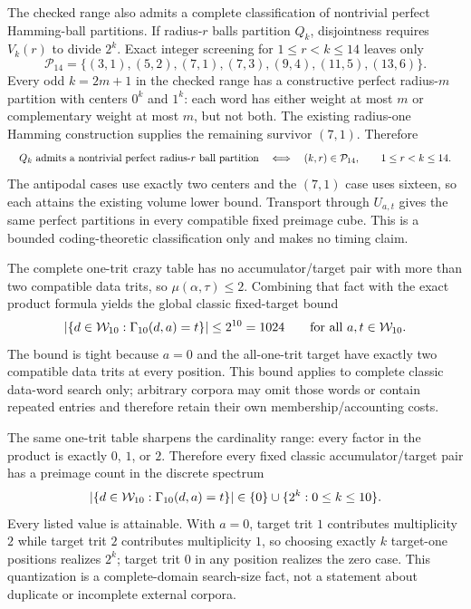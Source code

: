 \documentclass{article}
\newcommand{\fitmath}[1]{\resizebox{0.99\linewidth}{!}{$\displaystyle #1$}}
\begin{document}
The checked range also admits a complete classification of nontrivial perfect
Hamming-ball partitions. If radius-$r$ balls partition $Q_k$, disjointness
requires $V_k(r)$ to divide $2^k$. Exact integer screening for
$1\leq r<k\leq14$ leaves only
\[
  \mathcal{P}_{14}=\{(3,1),(5,2),(7,1),(7,3),(9,4),(11,5),(13,6)\}.
\]
Every odd $k=2m+1$ in the checked range has a constructive perfect radius-$m$
partition with centers $0^k$ and $1^k$: each word has either weight at most $m$
or complementary weight at most $m$, but not both. The existing radius-one
Hamming construction supplies the remaining survivor $(7,1)$. Therefore
\begin{equation}
  \fitmath{%
    Q_k\text{ admits a nontrivial perfect radius-$r$ ball partition}
      \quad\Longleftrightarrow\quad (k,r)\in\mathcal{P}_{14},
    \qquad 1\leq r<k\leq14.
  }
  \label{eq:optimization-crazy-preimage-cube-perfect-radius-classification}
\end{equation}
The antipodal cases use exactly two centers and the $(7,1)$ case uses sixteen,
so each attains the existing volume lower bound. Transport through $U_{a,t}$
gives the same perfect partitions in every compatible fixed preimage cube. This
is a bounded coding-theoretic classification only and makes no timing claim.

The complete one-trit crazy table has no accumulator/target pair with more than
two compatible data trits, so $\mu(\alpha,\tau)\leq2$. Combining that fact with
the exact product formula yields the global classic fixed-target bound
\begin{equation}
  \left|\{d\in\mathcal{W}_{10}:\Gamma_{10}\!\left(d,a\right)=t\}\right|
    \leq 2^{10}=1024
  \qquad\text{for all }a,t\in\mathcal{W}_{10}.
  \label{eq:optimization-crazy-preimage-bound}
\end{equation}
The bound is tight because $a=0$ and the all-one-trit target have exactly two
compatible data trits at every position. This bound applies to complete
classic data-word search only; arbitrary corpora may omit those words or contain
repeated entries and therefore retain their own membership/accounting costs.

The same one-trit table sharpens the cardinality range: every factor in the
product is exactly $0$, $1$, or $2$. Therefore every fixed classic
accumulator/target pair has a preimage count in the discrete spectrum
\begin{equation}
  \left|\{d\in\mathcal{W}_{10}:\Gamma_{10}\!\left(d,a\right)=t\}\right|
    \in \{0\}\cup\{2^k:0\leq k\leq10\}.
  \label{eq:optimization-crazy-preimage-spectrum}
\end{equation}
Every listed value is attainable. With $a=0$, target trit $1$ contributes
multiplicity $2$ while target trit $2$ contributes multiplicity $1$, so choosing
exactly $k$ target-one positions realizes $2^k$; target trit $0$ in any position
realizes the zero case. This quantization is a complete-domain search-size fact,
not a statement about duplicate or incomplete external corpora.
\end{document}
